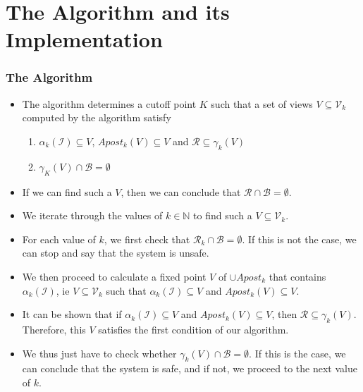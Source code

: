 \documentclass{beamer}
\begin{document}
    \section{The Algorithm and its Implementation}
    {
        \begin{frame}
            \frametitle{The Algorithm}
            \begin{itemize}
                \item The algorithm determines a cutoff point $K$ such that a set of views $V \subseteq \mathcal{V}_{k}$ computed by the algorithm satisfy
                \begin{enumerate}
                    \item $\alpha_{k}(\mathcal{I}) \subseteq V$, $Apost_{k}(V) \subseteq V$ and $\mathcal{R} \subseteq \gamma_{k}(V)$
                    \item $\gamma_{K}(V) \cap \mathcal{B} = \emptyset$
                \end{enumerate}
                \item If we can find such a $V$, then we can conclude that $\mathcal{R} \cap \mathcal{B} = \emptyset$.
                \item We iterate through the values of $k \in \mathbb{N}$ to find such a $V \subseteq \mathcal{V}_{k}$.
                \item For each value of $k$, we first check that $\mathcal{R}_{k} \cap \mathcal{B} = \emptyset$. If this is not the case, we can stop and say that the system is unsafe.
                \item We then proceed to calculate a fixed point $V$ of $\cup Apost_{k}$ that contains $\alpha_{k}(\mathcal{I})$, ie $V \subseteq \mathcal{V}_{k}$ such that $\alpha_{k}(\mathcal{I}) \subseteq V$ and $Apost_{k}(V) \subseteq V$.
                \item It can be shown that if $\alpha_{k}(\mathcal{I}) \subseteq V$ and $Apost_{k}(V) \subseteq V$, then $\mathcal{R} \subseteq \gamma_{k}(V)$. Therefore, this $V$ satisfies the first condition of our algorithm.
                \item We thus just have to check whether $\gamma_{k}(V) \cap \mathcal{B} = \emptyset$. If this is the case, we can conclude that the system is safe, and if not, we proceed to the next value of $k$.
            \end{itemize}
        \end{frame}

}
\end{document}
